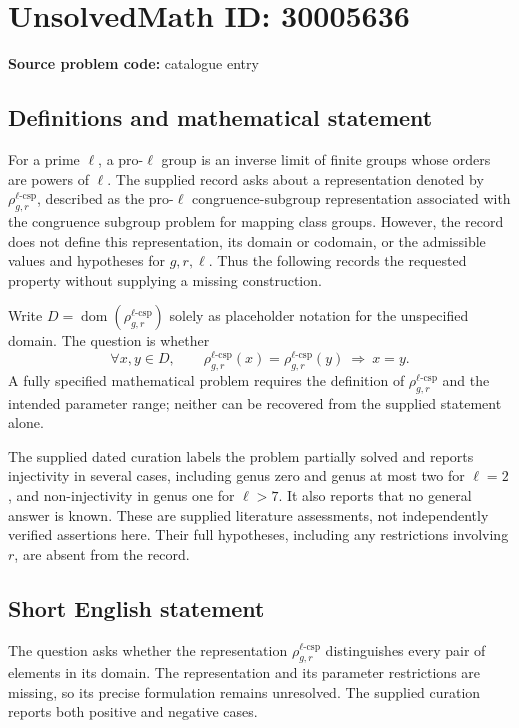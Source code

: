 \documentclass[11pt]{article}
\begin{document}
\section*{UnsolvedMath ID: 30005636}
\textbf{Source problem code:} catalogue entry
\subsection{Definitions and mathematical statement}
For a prime \(\ell\), a pro-\(\ell\) group is an inverse limit of finite groups whose orders are powers of \(\ell\). The supplied record asks about a representation denoted by \(\rho^{\ell\text{-csp}}_{g,r}\), described as the pro-\(\ell\) congruence-subgroup representation associated with the congruence subgroup problem for mapping class groups. However, the record does not define this representation, its domain or codomain, or the admissible values and hypotheses for \(g,r,\ell\). Thus the following records the requested property without supplying a missing construction.

Write \(D=\operatorname{dom}(\rho^{\ell\text{-csp}}_{g,r})\) solely as placeholder notation for the unspecified domain. The question is whether
\[
\forall x,y\in D,\qquad
\rho^{\ell\text{-csp}}_{g,r}(x)=\rho^{\ell\text{-csp}}_{g,r}(y)
\ \Longrightarrow\ x=y.
\]
A fully specified mathematical problem requires the definition of \(\rho^{\ell\text{-csp}}_{g,r}\) and the intended parameter range; neither can be recovered from the supplied statement alone.

The supplied dated curation labels the problem partially solved and reports injectivity in several cases, including genus zero and genus at most two for \(\ell=2\), and non-injectivity in genus one for \(\ell>7\). It also reports that no general answer is known. These are supplied literature assessments, not independently verified assertions here. Their full hypotheses, including any restrictions involving \(r\), are absent from the record.
\subsection{Short English statement}
The question asks whether the representation \(\rho^{\ell\text{-csp}}_{g,r}\) distinguishes every pair of elements in its domain. The representation and its parameter restrictions are missing, so its precise formulation remains unresolved. The supplied curation reports both positive and negative cases.
\end{document}
